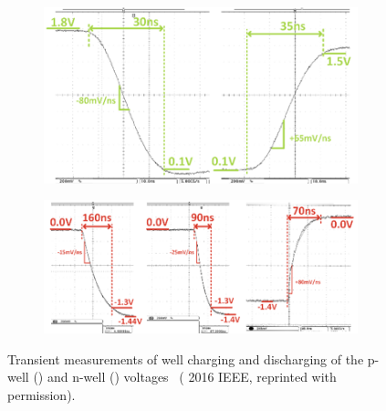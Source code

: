 \documentclass[graybox]{svmult}
\begin{document}
\begin{figure}
  \centering
  \begin{subfigure}[t]{0.8\textwidth}
  \centering
  \includegraphics[width=\textwidth]{bbgen-results-transient-a}
  \caption{}
  \label{fig:bbgen-results-transient-a}
  \end{subfigure}
  \par\bigskip
  \begin{subfigure}[t]{0.8\textwidth}
  \centering
  \includegraphics[width=\textwidth]{bbgen-results-transient-b}
  \caption{}
  \label{fig:bbgen-results-transient-b}
  \end{subfigure}
  \caption{Transient measurements of well charging and discharging of the p-well () and n-well () voltages~\cite{Blagojevic2016} ({\textcopyright} 2016 IEEE, reprinted with permission).}
  \label{fig:bbgen-results-transient}
\end{figure}
\end{document}
